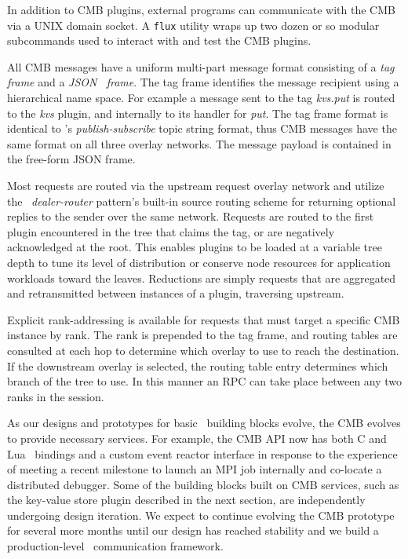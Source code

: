 In addition to CMB plugins, external programs can communicate with the CMB
via a UNIX domain socket.  A {\tt flux} utility wraps up two dozen or so
modular subcommands used to interact with and test the CMB plugins.

All CMB messages have a uniform multi-part message format consisting of
a {\em tag frame} and a {\em JSON~\cite{rfc4627} frame}.  The tag frame identifies the
message recipient using a hierarchical name space.  For example a message
sent to the tag {\em kvs.put} is routed to the {\em kvs} plugin, and internally
to its handler for {\em put}.  The tag frame format is identical to
\zMQ's {\em publish-subscribe} topic string format, thus CMB messages
have the same format on all three overlay networks.
The message payload is contained in the free-form JSON frame.

Most requests are routed via the upstream request overlay network
and utilize the \zMQ\ {\em dealer-router} pattern's built-in source routing
scheme for returning optional replies to the sender over the same network.
Requests are routed to the first plugin encountered in the tree that claims
the tag, or are negatively acknowledged at the root.  This enables plugins
to be loaded at a variable tree depth to tune its level of distribution
or conserve node resources for application workloads toward the leaves.
Reductions are simply requests that are aggregated and retransmitted between
instances of a plugin, traversing upstream.

Explicit rank-addressing is available for requests that must target a
specific CMB instance by rank.  The rank is prepended to the tag frame,
and routing tables are consulted at each hop to determine which overlay
to use to reach the destination.  If the downstream overlay is selected,
the routing table entry determines which branch of the tree to use.
In this manner an RPC can take place between any two ranks in the session.

As our designs and prototypes for basic \flux\ building blocks evolve,
the CMB evolves to provide necessary services.  For example, the CMB API
now has both C and Lua~\cite{LuaBook}  bindings and a custom event reactor interface in
response to the experience of meeting a recent milestone to launch an
MPI job internally and co-locate a distributed debugger.  Some of the building
blocks built on CMB services, such as the key-value store plugin described
in the next section, are independently undergoing design iteration.
We expect to continue evolving the CMB prototype for several more months until
our design has reached stability and we build a production-level \flux\ 
communication framework.
